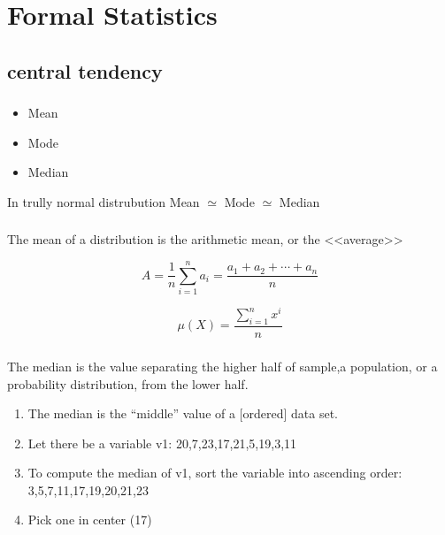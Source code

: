 \documentclass[t, 11pt]{beamer}
\newcommand\Warning{%
	\makebox[1.4em][c]{%
		\makebox[0pt][c]{\raisebox{.1em}{\small!}}%
		\makebox[0pt][c]{\color{red}\Large$\bigtriangleup$}}}%
\begin{document}
\section{Formal Statistics}
\subsection{central tendency}
\begin{frame} 
	\frametitle{\insertsection} 
	\framesubtitle{\insertsubsection}
	
	\begin{itemize}
		\item Mean
		\item Mode
		\item Median
	\end{itemize}

\Warning  In trully normal distrubution Mean  $\simeq$  Mode $\simeq$  Median
	
\end{frame}	

\begin{frame} 
	\frametitle{\insertsection} 
	\framesubtitle{\insertsubsection}
	The mean of a distribution is the arithmetic mean, or the <<average>>
	
	$${\displaystyle A={\frac {1}{n}}\sum _{i=1}^{n}a_{i}={\frac {a_{1}+a_{2}+\cdots +a_{n}}{n}}}$$
	
	$$\mu(X) = \frac{\sum_{i=1}^{n}x^{i}}{n}$$


	
\end{frame}	

\begin{frame} 
	\frametitle{\insertsection} 
	\framesubtitle{\insertsubsection}
	
	The median is the value separating the higher half of sample,a population, or a probability distribution, from the lower half.
	\begin{enumerate}
	\item The median is the “middle” value of a [ordered] data set.
	\item Let there be a variable v1: 20,7,23,17,21,5,19,3,11 
	\item To compute the median of v1, sort the variable into ascending order: 3,5,7,11,17,19,20,21,23
	\item Pick one in center (17)
	\end{enumerate}
	
	\end{frame}	
\end{document}
